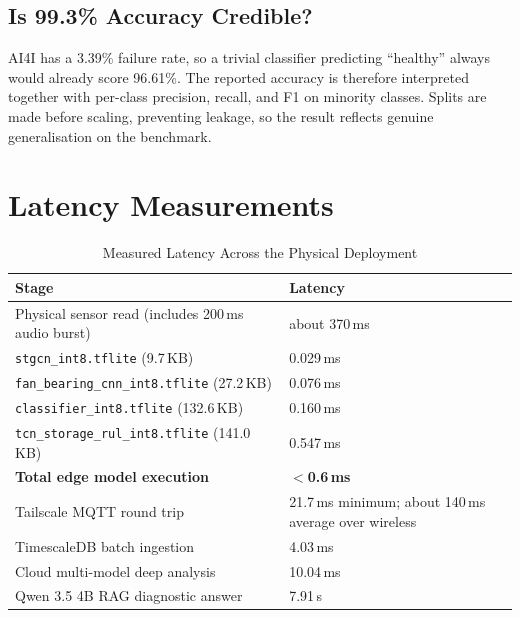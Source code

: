 \documentclass[12pt,a4paper]{report}
\begin{document}
\subsection{Is 99.3\% Accuracy Credible?}
AI4I has a 3.39\% failure rate, so a trivial classifier predicting ``healthy'' always would already score 96.61\%. The reported accuracy is therefore interpreted together with per-class precision, recall, and F1 on minority classes. Splits are made before scaling, preventing leakage, so the result reflects genuine generalisation on the benchmark.

\section{Latency Measurements}
\begin{table}[h!]
  \centering
  \caption{Measured Latency Across the Physical Deployment}
  \label{tab:latency}
  \vspace*{5pt}
  \footnotesize
  \renewcommand{\arraystretch}{1.4}
  \begin{tabular}{|p{7.4cm}|p{4.6cm}|}
    \hline
    \textbf{Stage} & \textbf{Latency} \\ \hline
    Physical sensor read (includes 200\,ms audio burst) & about 370\,ms \\ \hline
    \texttt{stgcn\_int8.tflite} (9.7\,KB) & 0.029\,ms \\ \hline
    \texttt{fan\_bearing\_cnn\_int8.tflite} (27.2\,KB) & 0.076\,ms \\ \hline
    \texttt{classifier\_int8.tflite} (132.6\,KB) & 0.160\,ms \\ \hline
    \texttt{tcn\_storage\_rul\_int8.tflite} (141.0\,KB) & 0.547\,ms \\ \hline
    \textbf{Total edge model execution} & \textbf{$<$0.6\,ms} \\ \hline
    Tailscale MQTT round trip & 21.7\,ms minimum; about 140\,ms average over wireless \\ \hline
    TimescaleDB batch ingestion & 4.03\,ms \\ \hline
    Cloud multi-model deep analysis & 10.04\,ms \\ \hline
    Qwen 3.5 4B RAG diagnostic answer & 7.91\,s \\ \hline
  \end{tabular}
\end{table}
\end{document}
